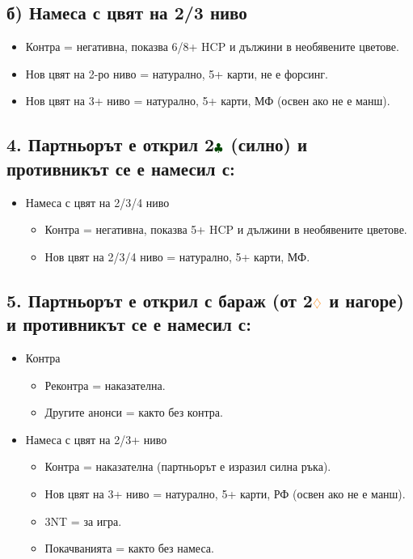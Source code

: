 \documentclass[10pt,a5paper]{extarticle}
\newcommand{\Rdiamond}{\textcolor{orange}{\diamondsuit}}
\newcommand{\Bclub}{\textcolor{darkgreen}{\clubsuit}}
\begin{document}
\subsection*{б) Намеса с цвят на 2/3 ниво}
\begin{itemize}
    \item Контра = негативна, показва 6/8+ HCP и дължини в необявените цветове.
    \item Нов цвят на 2-ро ниво = натурално, 5+ карти, не е форсинг.
    \item Нов цвят на 3+ ниво = натурално, 5+ карти, МФ (освен ако не е манш).
\end{itemize}


\subsection*{4. Партньорът е открил 2$\Bclub$ (силно) и противникът се е намесил с:}
\begin{itemize}
    \item[] Намеса с цвят на 2/3/4 ниво  
        \begin{itemize}
            \item Контра = негативна, показва 5+ HCP и дължини в необявените цветове.  
            \item Нов цвят на 2/3/4 ниво = натурално, 5+ карти, МФ.  
        \end{itemize}
\end{itemize}

\subsection*{5. Партньорът е открил с бараж (от 2$\Rdiamond$ и нагоре) и противникът се е намесил с:}
\begin{itemize}
    \item[] Контра  
        \begin{itemize}
            \item Реконтра = наказателна.  
            \item Другите анонси = както без контра.  
        \end{itemize}
    \item[] Намеса с цвят на 2/3+ ниво  
        \begin{itemize}
            \item Контра = наказателна (партньорът е изразил силна ръка).  
            \item Нов цвят на 3+ ниво = натурално, 5+ карти, РФ (освен ако не е манш).  
            \item 3NT = за игра.  
            \item Покачванията = както без намеса.  
        \end{itemize}
\end{itemize}
\end{document}
